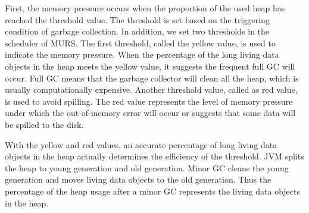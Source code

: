 First, the memory pressure occurs when the proportion of the used heap has reached the threshold value. The threshold is set based on the triggering condition of garbage collection. In addition, we set two thresholds in the scheduler of MURS. The first threshold, called the yellow value, is used to indicate the memory pressure. When the percentage of the long living data objects in the heap meets the yellow value, it suggests the frequent full GC will occur. Full GC means that the garbage collector will clean all the heap, which is usually computationally expensive. Another threshold value, called as red value, is used to avoid spilling. The red value represents the level of memory pressure under which the out-of-memory error will occur or suggests that some data will be spilled to the disk. 

With the yellow and red values, an accurate percentage of long living data objects in the heap actually determines the efficiency of the threshold. JVM splits the heap to young generation and old generation. Minor GC cleans the young generation and moves living data objects to the old generation. Thus the percentage of the heap usage after a minor GC represents the living data objects in the heap. 



